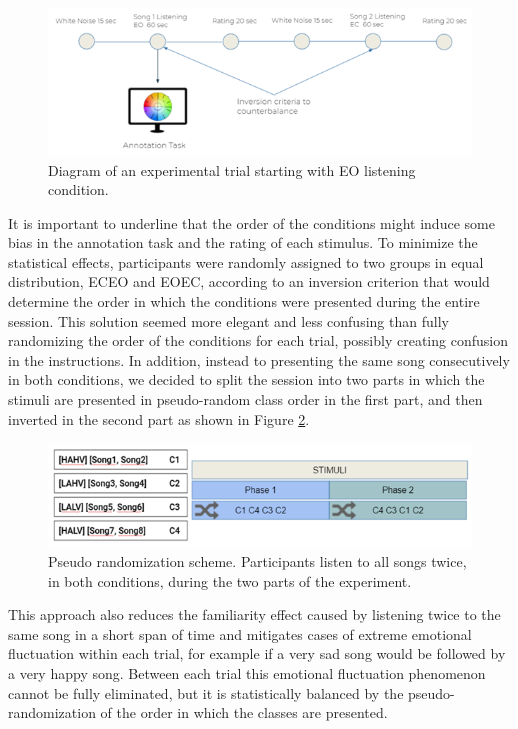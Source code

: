 \begin{figure}[h!]
\includegraphics[width=12cm]{img/methods/experimental_trial.png}
\centering
\caption{Diagram of an experimental trial starting with EO listening condition.} \label{fig_experimental_trial}
\end{figure}

It is important to underline that the order of the conditions might induce some bias in the annotation task and the rating of each stimulus. To minimize the statistical effects, participants were randomly assigned to two groups in equal distribution, ECEO and EOEC, according to an inversion criterion that would determine the order in which the conditions were presented during the entire session. This solution seemed more elegant and less confusing than fully randomizing the order of the conditions for each trial, possibly creating confusion in the instructions. In addition, instead to presenting the same song consecutively in both conditions, we decided to split the session into two parts in which the stimuli are presented in pseudo-random class order in the first part, and then inverted in the second part as shown in Figure \ref{fig_inversion_criterion}.

\begin{figure}[h!]
\includegraphics[width=12cm]{img/methods/inversion_criterion.png}
\centering
\caption{Pseudo randomization scheme. Participants listen to all songs twice, in both conditions, during the two parts of the experiment.} \label{fig_inversion_criterion}
\end{figure}

This approach also reduces the familiarity effect caused by listening twice to the same song in a short span of time and mitigates cases of extreme emotional fluctuation within each trial, for example if a very sad song would be followed by a very happy song. Between each trial this emotional fluctuation phenomenon cannot be fully eliminated, but it is statistically balanced by the pseudo-randomization of the order in which the classes are presented. 

